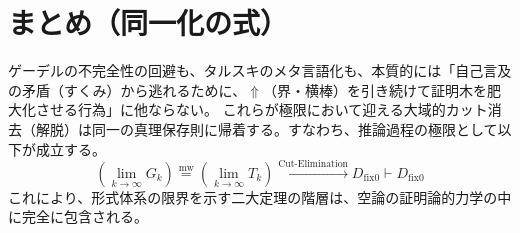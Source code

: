 \documentclass[12pt,a4paper]{article}
\newcommand{\mweq}{\mathrel{\overset{\mathrm{mw}}{=}}}
\newcommand{\dfix}{D_{\mathrm{fix}0}} %
\newcommand{\metanegation}{\Uparrow} %
\begin{document}
\section{まとめ（同一化の式）}
ゲーデルの不完全性の回避も、タルスキのメタ言語化も、本質的には「自己言及の矛盾（すくみ）から逃れるために、$\metanegation$（界・横棒）を引き続けて証明木を肥大化させる行為」に他ならない。
これらが極限において迎える大域的カット消去（解脱）は同一の真理保存則に帰着する。すなわち、推論過程の極限として以下が成立する。
\[
\left( \lim_{k \to \infty} G_k \right) \mweq \left( \lim_{k \to \infty} T_k \right) \xrightarrow{\text{Cut-Elimination}} \dfix \vdash \dfix
\]
これにより、形式体系の限界を示す二大定理の階層は、空論の証明論的力学の中に完全に包含される。
\end{document}
